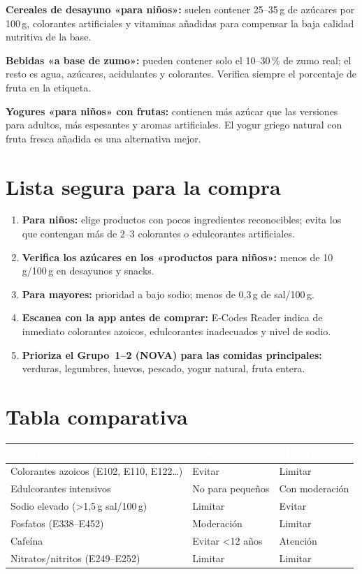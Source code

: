\documentclass[a5paper,12pt,oneside,openany]{book}
\begin{document}
\textbf{Cereales de desayuno «para niños»:} suelen contener 25--35\,g de
azúcares por 100\,g, colorantes artificiales y vitaminas añadidas para
compensar la baja calidad nutritiva de la base.

\textbf{Bebidas «a base de zumo»:} pueden contener solo el 10--30\,\% de zumo
real; el resto es agua, azúcares, acidulantes y colorantes. Verifica siempre
el porcentaje de fruta en la etiqueta.

\textbf{Yogures «para niños» con frutas:} contienen más azúcar que las versiones
para adultos, más espesantes y aromas artificiales. El yogur griego natural
con fruta fresca añadida es una alternativa mejor.

\section{Lista segura para la compra}

\begin{enumerate}
  \item \textbf{Para niños:} elige productos con pocos ingredientes reconocibles;
    evita los que contengan más de 2--3 colorantes o edulcorantes artificiales.
  \item \textbf{Verifica los azúcares en los «productos para niños»:}
    menos de 10\,g/100\,g en desayunos y snacks.
  \item \textbf{Para mayores:} prioridad a bajo sodio; menos de 0,3\,g de
    sal/100\,g.
  \item \textbf{Escanea con la app antes de comprar:} E-Codes Reader indica
    de inmediato colorantes azoicos, edulcorantes inadecuados y nivel de sodio.
  \item \textbf{Prioriza el Grupo~1--2 (NOVA) para las comidas principales:}
    verduras, legumbres, huevos, pescado, yogur natural, fruta entera.
\end{enumerate}

\section{Tabla comparativa}

{\small
\begin{tabularx}{\textwidth}{|L|l|l|}
\hline
{}
  \textcolor{white}{\textbf{Aditivo/ingrediente}}
  & \textcolor{white}{\textbf{Niños}}
  & \textcolor{white}{\textbf{Mayores}} \\
\hline
Colorantes azoicos (E102, E110, E122\ldots) & Evitar & Limitar \\
\hline
Edulcorantes intensivos & No para pequeños & Con moderación \\
\hline
Sodio elevado (>1,5\,g sal/100\,g) & Limitar & Evitar \\
\hline
Fosfatos (E338--E452) & Moderación & Limitar \\
\hline
Cafeína & Evitar <12 años & Atención \\
\hline
Nitratos/nitritos (E249--E252) & Limitar & Limitar \\
\hline
\end{tabularx}
}
\end{document}
